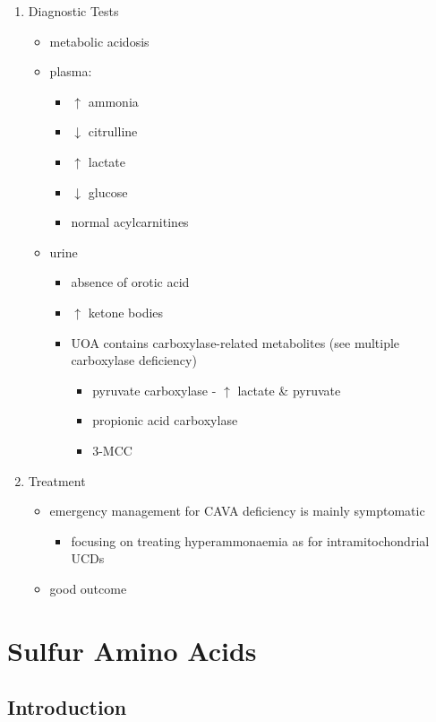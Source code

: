 \documentclass{scrartcl}
\begin{document}
\begin{enumerate}
\item Diagnostic Tests
\label{sec:org38dd710}
\begin{itemize}
\item metabolic acidosis
\item plasma:
\begin{itemize}
\item \(\uparrow\) ammonia
\item \(\downarrow\)  citrulline
\item \(\uparrow\) lactate
\item \(\downarrow\) glucose
\item normal acylcarnitines
\end{itemize}
\item urine
\begin{itemize}
\item absence of orotic acid
\item \(\uparrow\) ketone bodies
\item UOA contains carboxylase-related metabolites (see multiple
carboxylase deficiency)
\begin{itemize}
\item pyruvate carboxylase - \(\uparrow\) lactate \& pyruvate
\item propionic acid carboxylase
\item 3-MCC
\end{itemize}
\end{itemize}
\end{itemize}

\item Treatment
\label{sec:orga494e35}
\begin{itemize}
\item emergency management for CAVA deficiency is mainly symptomatic
\begin{itemize}
\item focusing on treating hyperammonaemia as for intramitochondrial UCDs
\end{itemize}
\item good outcome
\end{itemize}
\end{enumerate}

\section{Sulfur Amino Acids}
\label{sec:org17dccb1}
\subsection{Introduction}
\label{sec:org3602025}
\end{document}
